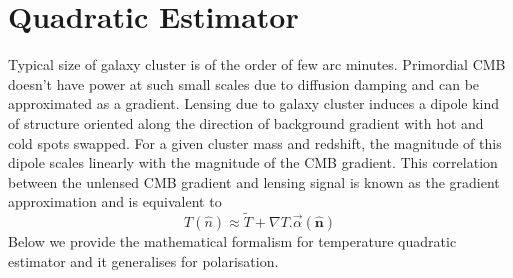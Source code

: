 \section{Quadratic Estimator}

Typical size of galaxy cluster is of the order of few arc minutes. 
Primordial CMB doesn't have power at such small scales due to diffusion damping \cite{Silk} and can be approximated as a gradient. 
Lensing due to galaxy cluster induces a dipole kind of structure oriented along the direction of background gradient with hot and cold spots swapped.
For a given cluster mass and redshift, the magnitude of this dipole scales linearly with the magnitude of the CMB gradient.
This correlation between the unlensed CMB gradient and lensing signal is known as the gradient approximation and is equivalent to
\begin{equation}
T (\hat{n})\approx \tilde{T}+ \nabla T . \vec{\alpha}(\hat{\textbf{n}})
\end{equation}
Below we provide the mathematical formalism for temperature quadratic estimator and it generalises for polarisation.

